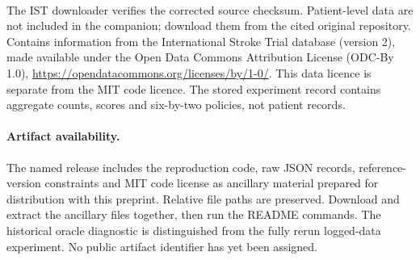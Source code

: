 \documentclass[11pt]{article}
\begin{document}
\begin{flushleft}\small
{}\\
\end{flushleft}
The IST downloader verifies the corrected source checksum. Patient-level data are not
included in the companion; download them from the cited original repository.
Contains information from the International Stroke Trial database (version 2),
made available under the Open Data Commons Attribution License (ODC-By 1.0),
\url{https://opendatacommons.org/licenses/by/1-0/}. This data licence is separate
from the MIT code licence. The stored experiment record contains aggregate
counts, scores and six-by-two policies, not patient records.
\paragraph{Artifact availability.}
The named release includes the reproduction code, raw JSON records,
reference-version constraints and MIT code license as ancillary material
prepared for distribution with this preprint. Relative file paths are
preserved. Download and extract the ancillary files together, then run the
README commands.
The historical oracle diagnostic is distinguished from the fully rerun
logged-data experiment. No public artifact identifier has yet been assigned.
\end{document}
